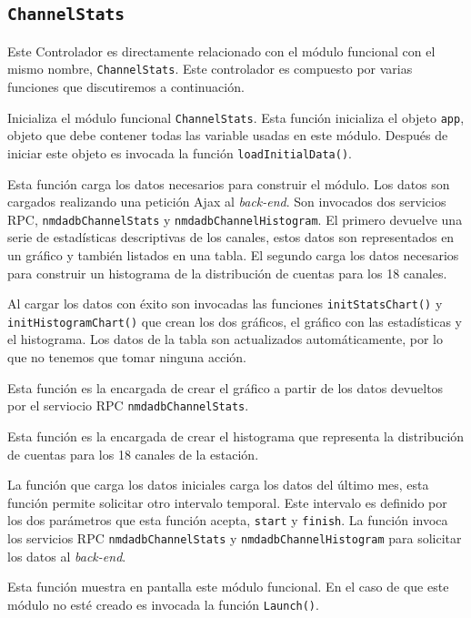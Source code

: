 	\subsection{\texttt{ChannelStats}}
		Este Controlador es directamente relacionado con el módulo funcional con el mismo nombre, \texttt{ChannelStats}. Este controlador es
		compuesto por varias funciones que discutiremos a continuación.
		\begin{description}[style=unboxed,leftmargin=0cm]
			\item[\texttt{Launch()}]
				Inicializa el módulo funcional \texttt{ChannelStats}. Esta función inicializa el objeto \texttt{app}, objeto que debe
				contener todas las variable usadas en este módulo. Después de iniciar este objeto es invocada la función
				\texttt{loadInitialData()}.
			\item[\texttt{loadInitialData()}]
				Esta función carga los datos necesarios para construir el módulo. Los datos son cargados realizando una petición Ajax
				al \emph{back-end}. Son invocados dos servicios RPC, \texttt{nmdadbChannelStats} y \texttt{nmdadbChannelHistogram}. El
				primero devuelve una serie de estadísticas descriptivas de los canales, estos datos son representados en un gráfico y
				también listados en una tabla. El segundo carga los datos necesarios para construir un histograma de la distribución
				de cuentas para los 18 canales.
				\par
				Al cargar los datos con éxito son invocadas las funciones \texttt{initStatsChart()} y \texttt{initHistogramChart()}
				que  crean los dos gráficos, el gráfico con las estadísticas y el histograma. Los datos de la tabla son actualizados
				automáticamente, por lo que no tenemos que tomar ninguna acción.
			\item[\texttt{initStatsChart()}]
				Esta función es la encargada de crear el gráfico a partir de los datos devueltos por el serviocio RPC
				\texttt{nmdadbChannelStats}. 
			\item[\texttt{initChannelHistogram()}]
				Esta función es la encargada de crear el histograma que representa la distribución de cuentas para los 18 canales de
				la estación.
			\item[\texttt{searchInterval()}]
				La función que carga los datos iniciales carga los datos del último mes, esta función permite solicitar otro intervalo
				temporal. Este intervalo es definido por los dos parámetros que esta función acepta, \texttt{start} y \texttt{finish}.
				La función invoca los servicios RPC \texttt{nmdadbChannelStats} y \texttt{nmdadbChannelHistogram} para solicitar los
				datos al \emph{back-end}.
			\item[\texttt{showModule()}]
				Esta función muestra en pantalla este módulo funcional. En el caso de que este módulo no esté creado es invocada la
				función \texttt{Launch()}.
		\end{description}
